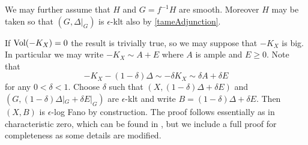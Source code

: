 We may further assume that $H$ and $G=f^{-1}H$ are smooth. Moreover $H$ may be taken so that $(G,\Delta|_{G})$ is $\epsilon$-klt also by \autoref{tameAdjunction}.

If $\text{Vol}(-K_{X})=0$ the result is trivially true, so we may suppose that $-K_{X}$ is big. In particular we may write $-K_{X}\sim A+E$ where $A$ is ample and $E \geq 0$. Note that $$-K_{X}-(1-\delta)\Delta\sim -\delta K_{X} \sim \delta A + \delta E$$ for any $0 < \delta <1$. Choose $\delta$ such that $(X,(1-\delta)\Delta+\delta E)$ and $(G,(1-\delta)\Delta|_{G}+\delta E|_{G})$ are $\epsilon$-klt and write $B=(1-\delta)\Delta+\delta E$. Then $(X,B)$ is $\epsilon$-log Fano by construction. The proof follows essentially as in characteristic zero, which can be found in \cite{jiang2014boundedness}, but we include a full proof for completeness as some details are modified.

